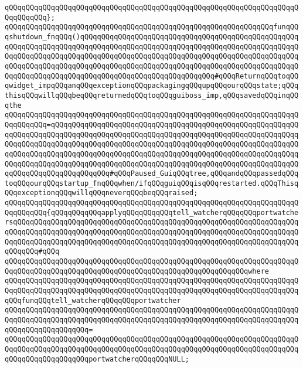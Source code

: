 \verb|qQQqqQQqqQQqqQQqqQQqqQQqqQQqqQQqqQQqqQQqqQQqqQQqqQQqqQQqqQQqqQQqqQQqqQQqqQQqqQQq};|\newline
\newline
\verb|qQQqqQQqqQQqqQQqqQQqqQQqqQQqqQQqqQQqqQQqqQQqqQQqqQQqqQQqqQQqqQQqfunqQQqshutdown_fnqQQq()qQQqqQQqqQQqqQQqqQQqqQQqqQQqqQQqqQQqqQQqqQQqqQQqqQQqqQQqqQQqqQQqqQQqqQQqqQQqqQQqqQQqqQQqqQQqqQQqqQQqqQQqqQQqqQQqqQQqqQQqqQQqqQQqqQQqqQQqqQQqqQQqqQQqqQQqqQQqqQQqqQQqqQQqqQQqqQQqqQQqqQQqqQQqqQQqqQQqqQQqqQQqqQQqqQQqqQQqqQQqqQQqqQQqqQQqqQQqqQQqqQQqqQQqqQQqqQQqqQQqqQQqqQQqqQQqqQQqqQQqqQQqqQQqqQQqqQQqqQQqqQQqqQQqqQQq#qQQqReturnqQQqtoqQQqwidget_impqQQqanqQQqexceptionqQQqpackagingqQQqupqQQqourqQQqstate;qQQqthisqQQqwillqQQqbeqQQqreturnedqQQqtoqQQqguiboss_imp,qQQqsavedqQQqinqQQqthe|\newline
\verb|qQQqqQQqqQQqqQQqqQQqqQQqqQQqqQQqqQQqqQQqqQQqqQQqqQQqqQQqqQQqqQQqqQQqqQQqqQQqqQQq=qQQqqQQqqQQqqQQqqQQqqQQqqQQqqQQqqQQqqQQqqQQqqQQqqQQqqQQqqQQqqQQqqQQqqQQqqQQqqQQqqQQqqQQqqQQqqQQqqQQqqQQqqQQqqQQqqQQqqQQqqQQqqQQqqQQqqQQqqQQqqQQqqQQqqQQqqQQqqQQqqQQqqQQqqQQqqQQqqQQqqQQqqQQqqQQqqQQqqQQqqQQqqQQqqQQqqQQqqQQqqQQqqQQqqQQqqQQqqQQqqQQqqQQqqQQqqQQqqQQqqQQqqQQqqQQqqQQqqQQqqQQqqQQqqQQqqQQqqQQqqQQqqQQqqQQqqQQqqQQqqQQqqQQqqQQqqQQqqQQqqQQqqQQqqQQqqQQqqQQqqQQq#qQQqPaused_GuiqQQqtree,qQQqandqQQqpassedqQQqtoqQQqourqQQqstartup_fnqQQqwhen/ifqQQqguiqQQqisqQQqrestarted.qQQqThisqQQqexceptionqQQqwillqQQqneverqQQqbeqQQqraised;|\newline
\verb|qQQqqQQqqQQqqQQqqQQqqQQqqQQqqQQqqQQqqQQqqQQqqQQqqQQqqQQqqQQqqQQqqQQqqQQqqQQqqQQq{qQQqqQQqqQQqapplyqQQqqQQqqQQqtell_watcherqQQqqQQqportwatchersqQQqqQQqqQQqqQQqqQQqqQQqqQQqqQQqqQQqqQQqqQQqqQQqqQQqqQQqqQQqqQQqqQQqqQQqqQQqqQQqqQQqqQQqqQQqqQQqqQQqqQQqqQQqqQQqqQQqqQQqqQQqqQQqqQQqqQQqqQQqqQQqqQQqqQQqqQQqqQQqqQQqqQQqqQQqqQQqqQQqqQQqqQQqqQQqqQQqqQQqqQQqqQQqqQQqqQQq#qQQq|\newline
\verb|qQQqqQQqqQQqqQQqqQQqqQQqqQQqqQQqqQQqqQQqqQQqqQQqqQQqqQQqqQQqqQQqqQQqqQQqqQQqqQQqqQQqqQQqqQQqqQQqqQQqqQQqqQQqqQQqqQQqqQQqqQQqqQQqwhere|\newline
\verb|qQQqqQQqqQQqqQQqqQQqqQQqqQQqqQQqqQQqqQQqqQQqqQQqqQQqqQQqqQQqqQQqqQQqqQQqqQQqqQQqqQQqqQQqqQQqqQQqqQQqqQQqqQQqqQQqqQQqqQQqqQQqqQQqqQQqqQQqqQQqqQQqfunqQQqtell_watcherqQQqqQQqportwatcher|\newline
\verb|qQQqqQQqqQQqqQQqqQQqqQQqqQQqqQQqqQQqqQQqqQQqqQQqqQQqqQQqqQQqqQQqqQQqqQQqqQQqqQQqqQQqqQQqqQQqqQQqqQQqqQQqqQQqqQQqqQQqqQQqqQQqqQQqqQQqqQQqqQQqqQQqqQQqqQQqqQQqqQQq=|\newline
\verb|qQQqqQQqqQQqqQQqqQQqqQQqqQQqqQQqqQQqqQQqqQQqqQQqqQQqqQQqqQQqqQQqqQQqqQQqqQQqqQQqqQQqqQQqqQQqqQQqqQQqqQQqqQQqqQQqqQQqqQQqqQQqqQQqqQQqqQQqqQQqqQQqqQQqqQQqqQQqqQQqportwatcherqQQqqQQqNULL;|\newline
